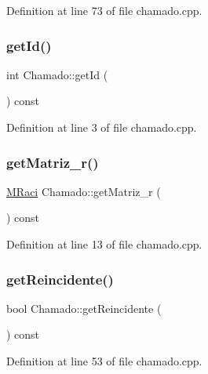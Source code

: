 Definition at line 73 of file chamado.\+cpp.

\hypertarget{class_chamado_af8c3890123d55faf3a9adc2a274daaf2}{}\label{class_chamado_af8c3890123d55faf3a9adc2a274daaf2} 
\subsubsection{\texorpdfstring{get\+Id()}{getId()}}
{\footnotesize\ttfamily int Chamado\+::get\+Id (\begin{DoxyParamCaption}{ }\end{DoxyParamCaption}) const}



Definition at line 3 of file chamado.\+cpp.

\hypertarget{class_chamado_a99eef2190042baefb398806d35372edd}{}\label{class_chamado_a99eef2190042baefb398806d35372edd} 
\subsubsection{\texorpdfstring{get\+Matriz\+\_\+r()}{getMatriz\_r()}}
{\footnotesize\ttfamily \hyperlink{class_m_raci}{M\+Raci} Chamado\+::get\+Matriz\+\_\+r (\begin{DoxyParamCaption}{ }\end{DoxyParamCaption}) const}



Definition at line 13 of file chamado.\+cpp.

\hypertarget{class_chamado_ad481bcca8ee859304d67728bff772b10}{}\label{class_chamado_ad481bcca8ee859304d67728bff772b10} 
\subsubsection{\texorpdfstring{get\+Reincidente()}{getReincidente()}}
{\footnotesize\ttfamily bool Chamado\+::get\+Reincidente (\begin{DoxyParamCaption}{ }\end{DoxyParamCaption}) const}



Definition at line 53 of file chamado.\+cpp.

\hypertarget{class_chamado_aa3f9a0756cd55a435fcbec3419a328dc}{}\label{class_chamado_aa3f9a0756cd55a435fcbec3419a328dc} 
